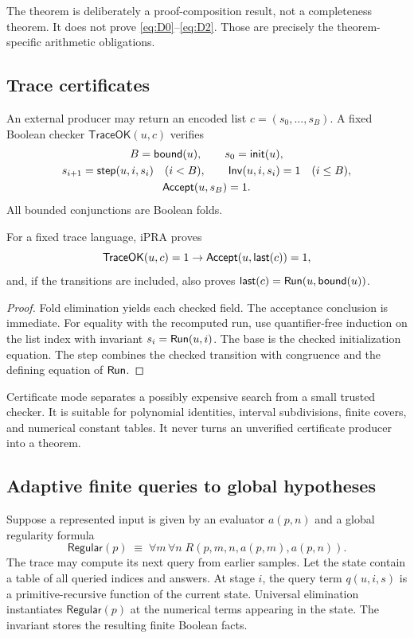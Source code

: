 The theorem is deliberately a proof-composition result, not a completeness theorem.  It does not prove \eqref{eq:D0}--\eqref{eq:D2}.  Those are precisely the theorem-specific arithmetic obligations.

\subsection{Trace certificates}

An external producer may return an encoded list $c=(s_0,\ldots,s_B)$.  A fixed Boolean checker $\mathsf{TraceOK}(u,c)$ verifies
\[
\begin{gathered}
B=\mathsf{bound}(u),\qquad s_0=\mathsf{init}(u),\\
s_{i+1}=\mathsf{step}(u,i,s_i)\quad(i<B),\qquad
\mathsf{Inv}(u,i,s_i)=1\quad(i\le B),\\
\mathsf{Accept}(u,s_B)=1.
\end{gathered}
\]
All bounded conjunctions are Boolean folds.

\begin{proposition}
\label{prop:det-cert-reflection}
For a fixed trace language, iPRA proves
\[
 \mathsf{TraceOK}(u,c)=1\to\mathsf{Accept}(u,\mathsf{last}(c))=1,
\]
and, if the transitions are included, also proves
$\mathsf{last}(c)=\mathsf{Run}(u,\mathsf{bound}(u))$.
\end{proposition}

\begin{proof}
Fold elimination yields each checked field.  The acceptance conclusion is immediate.  For equality with the recomputed run, use quantifier-free induction on the list index with invariant $s_i=\mathsf{Run}(u,i)$.  The base is the checked initialization equation.  The step combines the checked transition with congruence and the defining equation of $\mathsf{Run}$.
\end{proof}

Certificate mode separates a possibly expensive search from a small trusted checker.  It is suitable for polynomial identities, interval subdivisions, finite covers, and numerical constant tables.  It never turns an unverified certificate producer into a theorem.

\subsection{Adaptive finite queries to global hypotheses}

Suppose a represented input is given by an evaluator $a(p,n)$ and a global regularity formula
\[
 \mathsf{Regular}(p)\;\equiv\;\forall m\,\forall n\;R(p,m,n,a(p,m),a(p,n)).
\]
The trace may compute its next query from earlier samples.  Let the state contain a table of all queried indices and answers.  At stage $i$, the query term $q(u,i,s)$ is a primitive-recursive function of the current state.  Universal elimination instantiates $\mathsf{Regular}(p)$ at the numerical terms appearing in the state.  The invariant stores the resulting finite Boolean facts.

